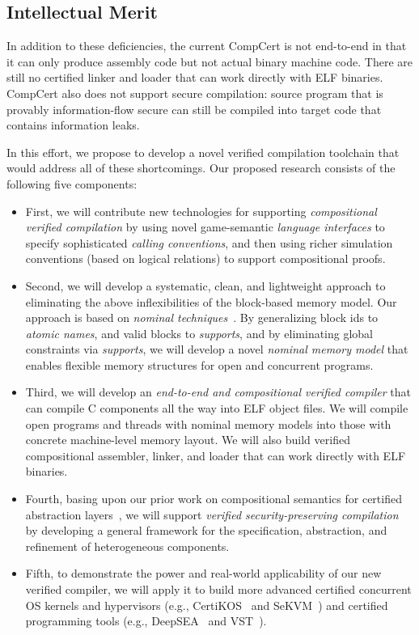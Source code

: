 \subsection{Intellectual Merit}
\label{ssec:intro-itm}

In addition to these deficiencies, the current CompCert is not end-to-end
in that it can only produce assembly code but not actual binary
machine code. There are still no certified linker and loader that can
work directly with ELF binaries.  CompCert also does not support secure
compilation: source program that is provably information-flow secure
can still be compiled into target code that contains information leaks.

In this effort, we propose to develop a novel verified compilation
toolchain that would address all of these shortcomings. Our
proposed research consists of the following five components:
\begin{itemize}
\item First, we will contribute new technologies for supporting {\em
  compositional verified compilation} by using novel game-semantic
  {\em language interfaces} to specify sophisticated {\em calling
    conventions}, and then using richer simulation conventions (based
  on logical relations) to support compositional proofs.
\item Second, we will develop a systematic, clean, and lightweight approach to
  eliminating the above inflexibilities of the block-based memory
  model. Our approach is based on \emph{nominal
  techniques}~\cite{pitts-nominal,gabby2002}. By generalizing block
  ids to {\em atomic names}, and valid blocks to {\em supports}, and by
  eliminating global constraints via {\em supports}, we will develop a
  novel {\em nominal memory model} that enables flexible memory
  structures for open and concurrent programs.
\item Third, we will develop an {\em end-to-end and compositional
  verified compiler} that can compile C components all the way into
  ELF object files. We will compile open programs and threads with
  nominal memory models into those with concrete machine-level memory
  layout. We will also build verified compositional assembler,
  linker, and loader that can work directly with ELF binaries.
\item Fourth, basing upon our prior work on compositional semantics
  for certified abstraction layers~\cite{dscal15,ccal18,koenig20,layered22},
  we will support {\em verified security-preserving
  compilation}~\cite{costanzo16} by developing a general framework
  for the specification, abstraction, and refinement of heterogeneous
  components.
\item Fifth, to demonstrate the power and real-world applicability of
  our new verified compiler, we will apply it to build more advanced
  certified concurrent OS kernels and hypervisors (e.g., CertiKOS~\cite{certikos-osdi16}
  and SeKVM~\cite{sekvm21a,sekvm21b,tao21}) and certified programming tools
    (e.g., DeepSEA~\cite{deepsea19} and VST~\cite{appel11:vst}).
\end{itemize}
